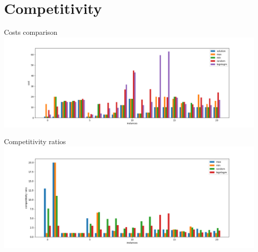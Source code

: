 \documentclass[aspectratio=169]{beamer}
\begin{document}
    \section{Competitivity}
    \begin{frame}{Costs comparison}
        \hspace*{-1.05in}
        \includegraphics[scale=0.48]{images/costs.png}
    \end{frame}
    \begin{frame}{Competitivity ratios}
        \hspace*{-1in}
        \includegraphics[scale=0.5]{images/competitivity ratio.png}
    \end{frame}
\end{document}
